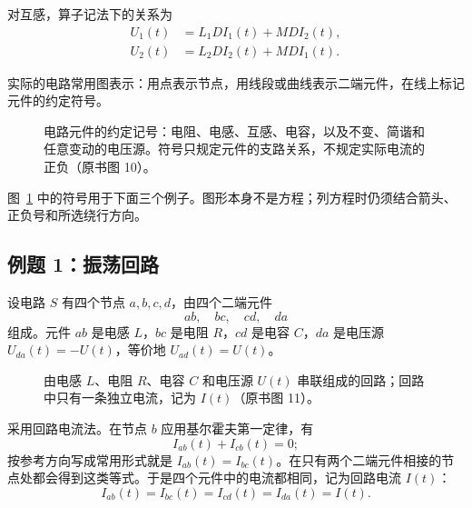 对互感，算子记法下的关系为
\begin{align}
 U_1(t)&=L_1D I_1(t)+MD I_2(t),
 \label{eq:ch2-13-mutual-operator-first}\\
 U_2(t)&=L_2D I_2(t)+MD I_1(t).
 \label{eq:ch2-13-mutual-operator-second}
\end{align}

实际的电路常用图表示：用点表示节点，用线段或曲线表示二端元件，在线上标记元件的约定符号。

\begin{figure}[H]
 \centering
 \resizebox{0.42\textwidth}{!}{}
 \caption{电路元件的约定记号：电阻、电感、互感、电容，以及不变、简谐和任意变动的电压源。符号只规定元件的支路关系，不规定实际电流的正负（原书图 10）。}
 \label{fig:ch2-13-symbols}
\end{figure}

图~\ref{fig:ch2-13-symbols} 中的符号用于下面三个例子。图形本身不是方程；列方程时仍须结合箭头、正负号和所选绕行方向。

\subsection*{例题 1：振荡回路}

设电路 \(S\) 有四个节点 \(a,b,c,d\)，由四个二端元件
\[
 ab,\quad bc,\quad cd,\quad da
\]
组成。元件 \(ab\) 是电感 \(L\)，\(bc\) 是电阻 \(R\)，\(cd\) 是电容 \(C\)，\(da\) 是电压源 \(U_{da}(t)=-U(t)\)，等价地 \(U_{ad}(t)=U(t)\)。

\begin{figure}[H]
 \centering
 \resizebox{0.48\textwidth}{!}{}
 \caption{由电感 \(L\)、电阻 \(R\)、电容 \(C\) 和电压源 \(U(t)\) 串联组成的回路；回路中只有一条独立电流，记为 \(I(t)\)（原书图 11）。}
 \label{fig:ch2-13-oscillator-circuit}
\end{figure}

采用回路电流法。在节点 \(b\) 应用基尔霍夫第一定律，有
\begin{equation}
 I_{ab}(t)+I_{cb}(t)=0;
\end{equation}
按参考方向写成常用形式就是 \(I_{ab}(t)=I_{bc}(t)\)。在只有两个二端元件相接的节点处都会得到这类等式。于是四个元件中的电流都相同，记为回路电流 \(I(t)\)：
\begin{equation}
 I_{ab}(t)=I_{bc}(t)=I_{cd}(t)=I_{da}(t)=I(t).
 \label{eq:ch2-13-loop-current}
\end{equation}

